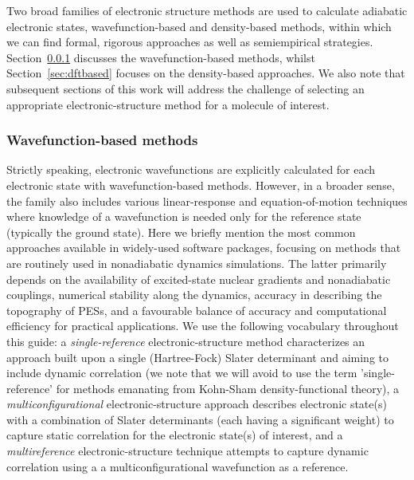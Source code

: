\documentclass[9pt,bestpractices]{livecoms}
\begin{document}
Two broad families of electronic structure methods are used to calculate adiabatic electronic states, wavefunction-based and density-based methods, within which we can find formal, rigorous approaches as well as semiempirical strategies. Section~\ref{sec:wft} discusses the wavefunction-based methods, whilst Section~\ref{sec:dftbased} focuses on the density-based approaches. We also note that subsequent sections of this work will address the challenge of selecting an appropriate electronic-structure method for a molecule of interest.

\subsubsection{Wavefunction-based methods}
\label{sec:wft}

Strictly speaking, electronic wavefunctions are explicitly calculated for each electronic state with wavefunction-based methods. However, in a broader sense, the family also includes various linear-response and equation-of-motion techniques where knowledge of a wavefunction is needed only for the reference state (typically the ground state). Here we briefly mention the most common approaches available in widely-used software packages, focusing on methods that are routinely used in nonadiabatic dynamics simulations.\cite{crespo2018recent,gonzalez2012progress} The latter primarily depends on the availability of excited-state nuclear gradients and nonadiabatic couplings, numerical stability along the dynamics, accuracy in describing the topography of PESs, and a favourable balance of accuracy and computational efficiency for practical applications. We use the following vocabulary throughout this guide: a \textit{single-reference} electronic-structure method characterizes an approach built upon a single (Hartree-Fock) Slater determinant and aiming to include dynamic correlation (we note that we will avoid to use the term 'single-reference' for methods emanating from Kohn-Sham density-functional theory), a \textit{multiconfigurational} electronic-structure approach describes electronic state(s) with a combination of Slater determinants (each having a significant weight) to capture static correlation for the electronic state(s) of interest, and a \textit{multireference} electronic-structure technique attempts to capture dynamic correlation using a a multiconfigurational wavefunction as a reference. 
\end{document}
